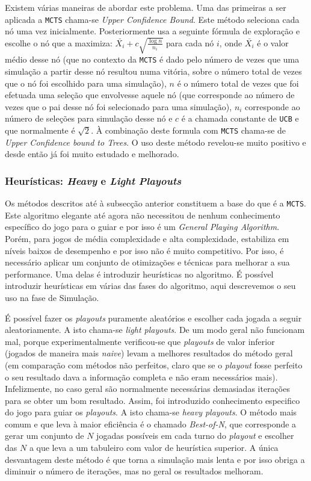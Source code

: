 \documentclass[12pt,a4paper,oneside]{article}
\begin{document}
Existem várias maneiras de abordar este problema. Uma das primeiras a
ser aplicada a \texttt{MCTS} chama-se \textit{Upper Confidence
  Bound}. Este método seleciona cada nó uma vez
inicialmente. Posteriormente usa a seguinte fórmula de exploração e
escolhe o nó que a maximiza: $\bar{X_i} + c
\sqrt{\frac{\log{n}}{n_i}}$ para cada nó $i$, onde $\bar{X_i}$ é o
valor médio desse nó (que no contexto da \texttt{MCTS} é dado pelo
número de vezes que uma simulação a partir desse nó resultou numa
vitória, sobre o número total de vezes que o nó foi escolhido para uma
simulação), $n$ é o número total de vezes que foi efetuada uma seleção
que envolvesse aquele nó (que corresponde ao número de vezes que o pai
desse nó foi selecionado para uma simulação), $n_i$ corresponde ao
número de seleções para simulação desse nó e $c$ é a chamada constante
de \texttt{UCB} e que normalmente é $\sqrt{2}$. À combinação deste
formula com \texttt{MCTS} chama-se de \textit{Upper Confidence bound
  to Trees}. O uso deste método revelou-se muito positivo e desde
então já foi muito estudado e melhorado.

\subsubsection{Heurísticas: \textit{Heavy} e \textit{Light} \textit{Playouts}}

Os métodos descritos até à subsecção anterior constituem a base do que
é a \texttt{MCTS}. Este algoritmo elegante até agora não necessitou de
nenhum conhecimento específico do jogo para o guiar e por isso é um
\textit{General Playing Algorithm}. Porém, para jogos de média
complexidade e alta complexidade, estabiliza em níveis baixos de
desempenho e por isso não é muito competitivo. Por isso, é necessário
aplicar um conjunto de otimizações e técnicas para melhorar a sua
performance. Uma delas é introduzir heurísticas no algoritmo. É
possível introduzir heurísticas em várias das fases do algoritmo, aqui
descrevemos o seu uso na fase de Simulação.

É possível fazer os \textit{playouts} puramente aleatórios e escolher
cada jogada a seguir aleatoriamente. A isto chama-se \textit{light
  playouts}. De um modo geral não funcionam mal, porque
experimentalmente verificou-se que \textit{playouts} de valor inferior
(jogados de maneira mais \textit{naive}) levam a melhores resultados
do método geral (em comparação com métodos não perfeitos, claro que se
o \textit{playout} fosse perfeito o seu resultado dava a informação
completa e não eram necessários mais). Infelizmente, no caso geral são
normalmente necessárias demasiadas iterações para se obter um bom
resultado. Assim, foi introduzido conhecimento especifico do jogo para
guiar os \textit{playouts}. A isto chama-se \textit{heavy playouts}. O
método mais comum e que leva à maior eficiência é o chamado
\textit{Best-of-N}, que corresponde a gerar um conjunto de $N$ jogadas
possíveis em cada turno do \textit{playout} e escolher das $N$ a que
leva a um tabuleiro com valor de heurística superior. A única
desvantagem deste método é que torna a simulação mais lenta e por isso
obriga a diminuir o número de iterações, mas no geral os resultados
melhoram.
\end{document}
